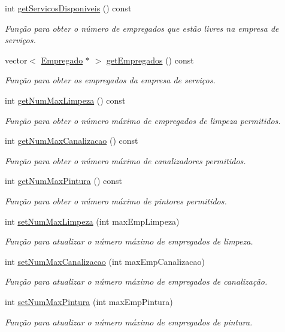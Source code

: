 \begin{DoxyCompactItemize}
int \hyperlink{class_servico_a1a9fbbe6413835ba366355cc4131c413}{get\+Servicos\+Disponiveis} () const 
\begin{DoxyCompactList}\small\item\em Função para obter o número de empregados que estão livres na empresa de serviços. \end{DoxyCompactList}\item 
vector$<$ \hyperlink{class_empregado}{Empregado} $\ast$ $>$ \hyperlink{class_servico_a9d7003d0cc174b05ee16b329d4c96b44}{get\+Empregados} () const 
\begin{DoxyCompactList}\small\item\em Função para obter os empregados da empresa de serviços. \end{DoxyCompactList}\item 
int \hyperlink{class_servico_a019fcbffefddc52608ee3e34a8479e85}{get\+Num\+Max\+Limpeza} () const 
\begin{DoxyCompactList}\small\item\em Função para obter o número máximo de empregados de limpeza permitidos. \end{DoxyCompactList}\item 
int \hyperlink{class_servico_a74c8980bc7ca92ce7cc6f9e41d73ca38}{get\+Num\+Max\+Canalizacao} () const 
\begin{DoxyCompactList}\small\item\em Função para obter o número máximo de canalizadores permitidos. \end{DoxyCompactList}\item 
int \hyperlink{class_servico_a34c593b378ec48353f86e807644fa97e}{get\+Num\+Max\+Pintura} () const 
\begin{DoxyCompactList}\small\item\em Função para obter o número máximo de pintores permitidos. \end{DoxyCompactList}\item 
int \hyperlink{class_servico_a7fe8edf7db877378814f963876957302}{set\+Num\+Max\+Limpeza} (int max\+Emp\+Limpeza)
\begin{DoxyCompactList}\small\item\em Função para atualizar o número máximo de empregados de limpeza. \end{DoxyCompactList}\item 
int \hyperlink{class_servico_a72827537e1eb452ec92437115e9bdc6c}{set\+Num\+Max\+Canalizacao} (int max\+Emp\+Canalizacao)
\begin{DoxyCompactList}\small\item\em Função para atualizar o número máximo de empregados de canalização. \end{DoxyCompactList}\item 
int \hyperlink{class_servico_a6648c64a113bb1b4958f883409d5fde5}{set\+Num\+Max\+Pintura} (int max\+Emp\+Pintura)
\begin{DoxyCompactList}\small\item\em Função para atualizar o número máximo de empregados de pintura. \end{DoxyCompactList}\end{DoxyCompactItemize}


